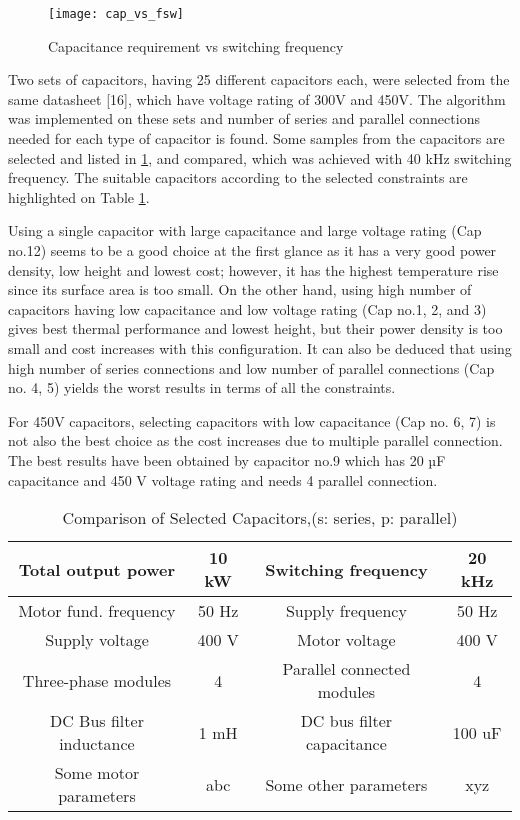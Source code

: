 \documentclass[conference,a4paper,twocolumn]{IEEEtran}
\begin{document}
\begin{figure}[h]
  \centering
  \texttt{[image: cap\_vs\_fsw]}
  \caption{Capacitance requirement vs switching frequency}
  \label{fig8}
\end{figure}

Two sets of capacitors, having 25 different capacitors each, were selected from the same datasheet [16], which have voltage rating of 300V and 450V. The algorithm was implemented on these sets and number of series and parallel connections needed for each type of capacitor is found. Some samples from the capacitors are selected and listed in \ref{table3}, and compared, which was achieved with 40 kHz switching frequency. The suitable capacitors according to the selected constraints are highlighted on Table \ref{table3}.

Using a single capacitor with large capacitance and large voltage rating (Cap no.12) seems to be a good choice at the first glance as it has a very good power density, low height and lowest cost; however, it has the highest temperature rise since its surface area is too small. On the other hand, using high number of capacitors having low capacitance and low voltage rating (Cap no.1, 2, and 3) gives best thermal performance and lowest height, but their power density is too small and cost increases with this configuration. It can also be deduced that using high number of series connections and low number of parallel connections (Cap no. 4, 5) yields the worst results in terms of all the constraints.

For 450V capacitors, selecting capacitors with low capacitance (Cap no. 6, 7) is not also the best choice as the cost increases due to multiple parallel connection. The best results have been obtained by capacitor no.9 which has 20 µF capacitance and 450 V voltage rating and needs 4 parallel connection.


\begin{table}[h]
\renewcommand{\arraystretch}{1.4}
\caption{Comparison of Selected Capacitors,(s: series, p: parallel)}
\label{table3}
\centering
\begin{tabular}{|c|c|c|c|}
\hline
Total output power & 10 kW & Switching frequency & 20 kHz\\
\hline
Motor fund. frequency & 50 Hz & Supply frequency & 50 Hz\\
\hline
Supply voltage & 400 V & Motor voltage & 400 V\\
\hline
Three-phase modules & 4 & Parallel connected modules & 4\\
\hline
DC Bus filter inductance & 1 mH & DC bus filter capacitance & 100 uF\\
\hline
Some motor parameters & abc & Some other parameters & xyz\\
\hline
\end{tabular}
\end{table}
\end{document}
